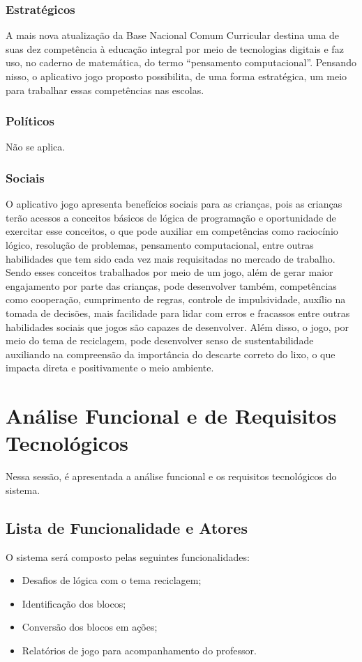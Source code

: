         \subsubsection{Estratégicos}
        A mais nova atualização da Base Nacional Comum Curricular destina uma de suas dez competência à educação integral por meio de tecnologias digitais e faz uso, no caderno de matemática, do termo “pensamento computacional”. Pensando nisso, o aplicativo jogo proposto possibilita, de uma forma estratégica, um meio para trabalhar essas competências nas escolas. 
        
        \subsubsection{Políticos}
        Não se aplica.

        \subsubsection{Sociais}
        O aplicativo jogo apresenta benefícios sociais para as crianças, pois as crianças terão acessos a conceitos básicos de lógica de programação e oportunidade de exercitar esse conceitos, o que pode auxiliar em competências como raciocínio lógico, resolução de problemas, pensamento computacional, entre outras habilidades que tem sido cada vez mais requisitadas no mercado de trabalho. Sendo esses conceitos trabalhados por meio de um jogo, além de gerar maior engajamento por parte das crianças, pode desenvolver também, competências como cooperação, cumprimento de regras, controle de impulsividade, auxílio na tomada de decisões, mais facilidade para lidar com erros e fracassos entre outras habilidades sociais que jogos são capazes de desenvolver.
        Além disso, o jogo, por meio do tema de reciclagem, pode desenvolver senso de sustentabilidade auxiliando na compreensão da importância do descarte correto do lixo, o que impacta direta e positivamente  o meio ambiente.

\section{Análise Funcional e de Requisitos Tecnológicos}
    Nessa sessão, é apresentada a análise funcional e os requisitos tecnológicos do sistema.

    \subsection{Lista de Funcionalidade e Atores}
    O sistema será composto  pelas seguintes funcionalidades:
    \begin{itemize}
        \item Desafios de lógica com o tema reciclagem;
        \item Identificação dos blocos;
        \item Conversão dos blocos em ações;
        \item Relatórios de jogo para acompanhamento do professor.
    \end{itemize}
    
